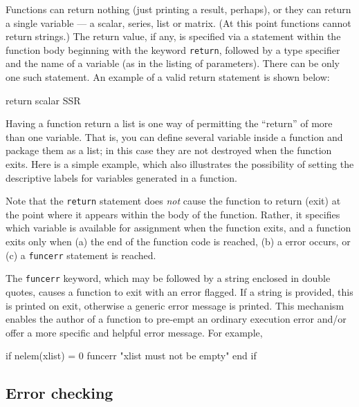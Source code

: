 Functions can return nothing (just printing a result, perhaps), or
they can return a single variable --- a scalar, series, list or
matrix.  (At this point functions cannot return strings.)
The return value, if any, is specified via a statement within the
function body beginning with the keyword \verb+return+, followed by a
type specifier and the name of a variable (as in the listing of
parameters).  There can be only one such statement.  An example of a
valid return statement is shown below:
%    
\begin{code}
return scalar SSR
\end{code}
%
Having a function return a list is one way of permitting the
``return'' of more than one variable.  That is, you can define several
variable inside a function and package them as a list; in this case
they are not destroyed when the function exits.  Here is a simple
example, which also illustrates the possibility of setting the
descriptive labels for variables generated in a function.
%    
%

Note that the \verb+return+ statement does \emph{not} cause the
function to return (exit) at the point where it appears within the
body of the function. Rather, it specifies which variable is available
for assignment when the function exits, and a function exits only when
(a) the end of the function code is reached, (b) a  error
occurs, or (c) a \verb+funcerr+ statement is reached.

The \verb+funcerr+ keyword, which may be followed by a string enclosed
in double quotes, causes a function to exit with an error flagged.  If
a string is provided, this is printed on exit, otherwise a generic
error message is printed.  This mechanism enables the author of a
function to pre-empt an ordinary execution error and/or offer a more
specific and helpful error message.  For example,
%
\begin{code}
if nelem(xlist) = 0
   funcerr "xlist must not be empty"
end if
\end{code}
    

\subsection{Error checking}

